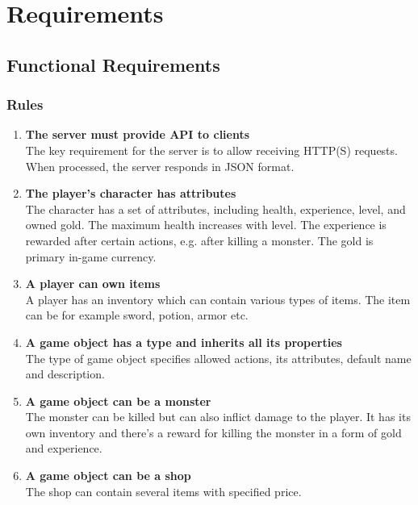 	
\section{Requirements}

	\subsection{Functional Requirements}
		\subsubsection{Rules}
		\begin{enumerate}
			\item \textbf{The server must provide API to clients} \\
			The key requirement for the server is to allow receiving HTTP(S) requests. When processed, the server responds in JSON format.
						
			\item \textbf{The player's character has attributes} \\
			The character has a set of attributes, including health, experience, level, and owned gold. The maximum health increases with level. The experience is rewarded after certain actions, e.g. after killing a monster. The gold is primary in-game currency.
			  
			\item \textbf{A player can own items} \\
			A player has an inventory which can contain various types of items. The item can be for example sword, potion, armor etc.
			
			\item \textbf{A game object has a type and inherits all its properties} \\
			The type of game object specifies allowed actions, its attributes, default name and description.			
			
			\item \textbf{A game object can be a monster} \\
			The monster can be killed but can also inflict damage to the player. It has its own inventory and there's a reward for killing the monster in a form of gold and experience.
			
			\item \textbf{A game object can be a shop} \\
			The shop can contain several items with specified price.  
			

\end{enumerate}
